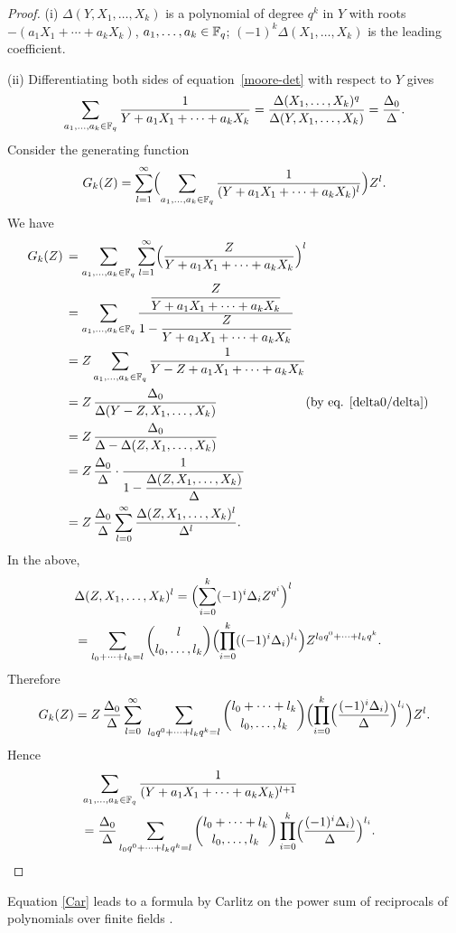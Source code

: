 \documentclass{amsart}
\numberwithin{equation}{section}
\theoremstyle{definition}
\begin{document}
\begin{proof} 
(i) $\Delta(Y,X_1,\dots,X_k)$ is a polynomial of degree $q^k$ in $Y$ with roots $-(a_1X_1+\cdots+a_kX_k)$, $a_1,\dots,a_k\in\Bbb F_q$; $(-1)^{k}\Delta(X_1,\dots,X_k)$ is the leading coefficient.

\medskip
(ii) Differentiating both sides of equation~\eqref{moore-det} with respect to $Y$ gives 
\begin{equation}\label{delta0/delta}
\sum_{a_1,\dots,a_k\in\Bbb F_q}\frac 1{Y+a_1X_1+\cdots+a_kX_k}=\frac{\Delta(X_1,\dots,X_k)^q}{\Delta(Y,X_1,\dots,X_k)}=\frac{\Delta_0}{\Delta}.
\end{equation}
Consider the generating function
\[
G_k(Z)=\sum_{l=1}^\infty\Bigl(\sum_{a_1,\dots,a_k\in\Bbb F_q}\frac 1{(Y+a_1X_1+\cdots+a_kX_k)^l}\Bigr)Z^l.
\]
We have
\begin{align*}
G_k(Z)\,&=\sum_{a_1,\dots,a_k\in\Bbb F_q}\sum_{l=1}^\infty\Bigl(\frac Z{Y+a_1X_1+\cdots+a_kX_k}\Bigr)^l\cr
&=\sum_{a_1,\dots,a_k\in\Bbb F_q}\frac{\displaystyle \frac Z{Y+a_1X_1+\cdots+a_kX_k}}{\displaystyle 1-\frac Z{Y+a_1X_1+\cdots+a_kX_k}}\cr
&=Z\sum_{a_1,\dots,a_k\in\Bbb F_q}\frac 1{Y-Z+a_1X_1+\cdots+a_kX_k}\cr
&=Z\,\frac{\Delta_0}{\Delta(Y-Z,X_1,\dots,X_k)}\kern 7em\text{(by eq. \eqref{delta0/delta})}\cr
&=Z\,\frac{\Delta_0}{\Delta-\Delta(Z,X_1,\dots,X_k)}\cr
&=Z\,\frac{\Delta_0}{\Delta}\cdot\frac 1{\displaystyle 1-\frac{\Delta(Z,X_1,\dots,X_k)}{\Delta}}\cr
&=Z\,\frac{\Delta_0}{\Delta}\sum_{l=0}^\infty\frac{\Delta(Z,X_1,\dots,X_k)^l}{\Delta^l}.
\end{align*}
In the above,
\begin{align*}
&\Delta(Z,X_1,\dots,X_k)^l=\Bigl(\sum_{i=0}^k(-1)^i\Delta_iZ^{q^i}\Bigr)^l\cr
&=\sum_{l_0+\cdots+l_k=l}\binom l{l_0,\dots,l_k}\Bigl(\prod_{i=0}^k((-1)^i\Delta_i)^{l_i}\Bigr)Z^{l_0q^0+\cdots+l_kq^k}.
\end{align*}
Therefore
\[
G_k(Z)=Z\,\frac{\Delta_0}\Delta\sum_{l=0}^\infty\;\sum_{l_0q^0+\cdots+l_kq^k=l}\binom{l_0+\cdots+l_k}{l_0,\dots,l_k}\Bigl(\prod_{i=0}^k\Bigl(\frac{(-1)^i\Delta_i)}\Delta\Bigr)^{l_i}\Bigr)Z^l.
\]
Hence
\begin{align*}
&\sum_{a_1,\dots,a_k\in\Bbb F_q}\frac 1{(Y+a_1X_1+\cdots+a_kX_k)^{l+1}}\cr
&=\frac{\Delta_0}\Delta\sum_{l_0q^0+\cdots+l_kq^k=l}\binom{l_0+\cdots+l_k}{l_0,\dots,l_k}\prod_{i=0}^k\Bigl(\frac{(-1)^i\Delta_i)}\Delta\Bigr)^{l_i}.
\end{align*}
\end{proof}

\medskip
{} Equation \eqref{Car} leads to a formula by Carlitz on the power sum of reciprocals of polynomials over finite fields \cite[Theorem~9.2]{Carlitz-DMJ-1935}.
 
\end{document}
